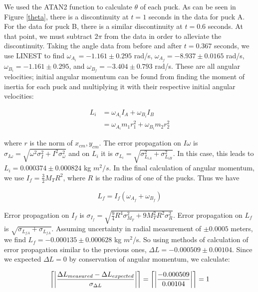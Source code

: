 \documentclass[11pt]{article}
\DeclarePairedDelimiter{\ceil}{\lceil}{\rceil}
\begin{document}
We used the ATAN2 function to calculate $\theta$ of each puck. As can be seen in Figure \ref{theta}, there is a discontinuity at $t=1$ seconds in the data for puck A. For the data for puck B, there is a similar discontinuity at $t=0.6$ seconds. At that point, we must subtract $2\pi$ from the data in order to alleviate the discontinuity. Taking the angle data from before and after $t=0.367$ seconds, we use LINEST to find $\omega_{A_i}=-1.161\pm0.295$ rad/s, $\omega_{A_f} = -8.937\pm0.0165$ rad/s, $\omega_{B_i}=-1.161\pm0.295$, and $\omega_{B_f} = -3.404\pm 0.793$ rad/s. These are all angular velocities; initial angular momentum can be found from finding the moment of inertia for each puck and multiplying it with their respective initial angular velocities:

\begin{align}
L_i &= \omega_{A_i}I_A + \omega_{B_i}I_B\\
&=  \omega_{A_i}m_1 r_1^2 + \omega_{B_i}m_2 r_2^2
\end{align}

where $r$ is the norm of $x_{cm}, y_{cm}$. The error propagation on $I\omega $ is $\sigma_{I\omega} = \sqrt{\omega^2\sigma_I^2 + I^2\sigma_{\omega}^2}$ and on $L_i$ it is $\sigma_{L_i} = \sqrt{\sigma_{L_{iA}}^2+\sigma_{L_{iB}}^2}$. In this case, this leads to $L_i = 0.000374\pm 0.000824$ kg $m^2/s$. In the final calculation of angular momentum, we use $I_f=\frac{3}{2}M_TR^2$, where $R$ is the radius of one of the pucks. Thus we have

\begin{align}
L_f = I_f(\omega_{A_f}+ \omega_{B_f})
\end{align}

Error propagation on $I_f$ is $\sigma_{I_f} = \sqrt{\frac{9}{4}R^4\sigma_{M_T}^2+9M_T^2R^2\sigma_{R}^2}$. Error propagation on $L_f$ is $\sqrt{\sigma_{L_{fA}}+\sigma_{L_{fA}}}$. Assuming uncertainty in radial measurement of $\pm 0.0005$ meters, we find $L_f = -0.000135\pm 0.000628$ kg $m^2$/s. So using methods of calculation of error propagation similar to the previous ones, $\Delta L = -0.000509 \pm 0.00104$. Since we expected $\Delta L = 0$ by conservation of angular momentum, we calculate:

\begin{align}
\ceil*{\left\vert\frac{\Delta L_{measured}-\Delta L_{expected}}{\sigma_{\Delta L}}\right\vert} = \ceil*{\left\vert\frac{-0.000509}{0.00104}\right\vert} = 1
\label{errL}
\end{align}
\end{document}
